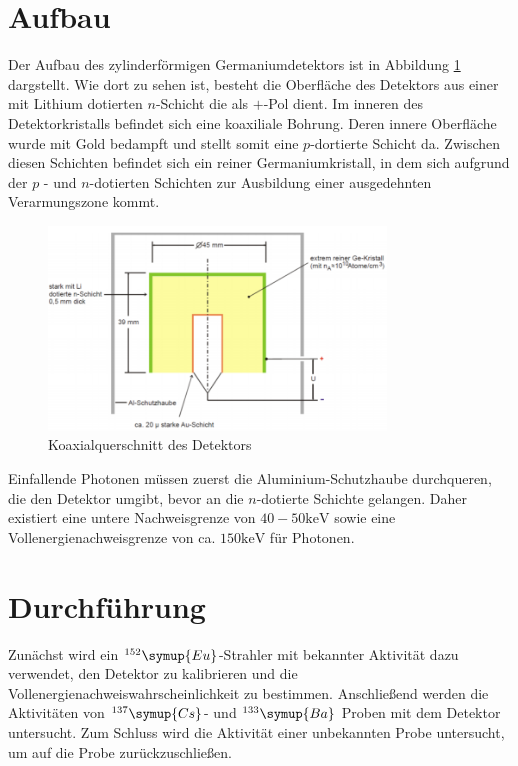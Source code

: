 \section{Aufbau}
Der Aufbau des zylinderförmigen Germaniumdetektors ist in Abbildung \ref{fig:Aufbau} dargstellt. Wie dort zu sehen ist, besteht die Oberfläche des Detektors aus einer mit Lithium dotierten $n$-Schicht die als $+$-Pol dient. Im inneren des Detektorkristalls befindet sich eine koaxiliale Bohrung. Deren innere Oberfläche wurde mit Gold bedampft und stellt somit eine $p$-dortierte Schicht da. Zwischen diesen Schichten befindet sich ein reiner Germaniumkristall, in dem sich aufgrund der $p$ - und $n$-dotierten Schichten zur Ausbildung einer ausgedehnten Verarmungszone kommt. 
\begin{figure}[H]
    \centering
    \includegraphics[width=0.8\textwidth]{content/images/Aufbau.png}
    \caption{Koaxialquerschnitt des Detektors}
    \label{fig:Aufbau}
\end{figure}
Einfallende Photonen müssen zuerst die Aluminium-Schutzhaube durchqueren, die den Detektor umgibt, bevor an die $n$-dotierte Schichte gelangen. Daher existiert eine untere Nachweisgrenze von $40-50 \si{\kilo \electronvolt}$ sowie eine Vollenergienachweisgrenze von ca. $150 \si{\kilo \electronvolt}$ für Photonen.

\section{Durchführung}
Zunächst wird ein $^{152}\symup{Eu}$-Strahler mit bekannter Aktivität dazu verwendet, den Detektor zu kalibrieren und die Vollenergienachweiswahrscheinlichkeit zu bestimmen. Anschließend werden die Aktivitäten von $^{137}\symup{Cs}$- und  $ ^{133}\symup{Ba} $ Proben mit dem Detektor untersucht. Zum Schluss wird die Aktivität einer unbekannten Probe untersucht, um auf die Probe zurückzuschließen. 